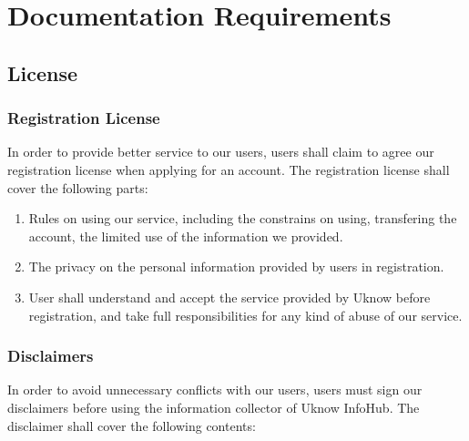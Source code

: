 \section{Documentation Requirements}

\subsection{License}

\subsubsection{Registration License}

In order to provide better service to our users, users shall claim to
agree our registration license when applying for an account. The
registration license shall cover the following parts:

\begin{enumerate}
\def\labelenumi{\arabic{enumi}.}
\item
  Rules on using our service, including the constrains on using,
  transfering the account, the limited use of the information we
  provided.
\item
  The privacy on the personal information provided by users in
  registration.
\item
  User shall understand and accept the service provided by Uknow before
  registration, and take full responsibilities for any kind of abuse of
  our service.
\end{enumerate}

\subsubsection{Disclaimers}

In order to avoid unnecessary conflicts with our users, users must sign
our disclaimers before using the information collector of Uknow InfoHub.
The disclaimer shall cover the following contents:

